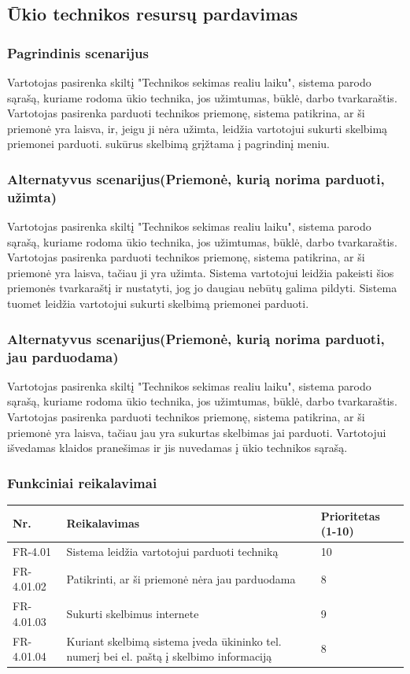\documentclass[oneside]{VUMIFPSkursinis}
\begin{document}
\subsection{Ūkio technikos resursų pardavimas}
\subsubsection{Pagrindinis scenarijus}
	Vartotojas pasirenka skiltį "Technikos sekimas realiu laiku", sistema parodo sąrašą, kuriame rodoma ūkio technika, jos užimtumas, būklė, darbo tvarkaraštis. Vartotojas pasirenka parduoti technikos priemonę, sistema patikrina, ar ši priemonė yra laisva, ir, jeigu ji nėra užimta, leidžia vartotojui sukurti skelbimą priemonei parduoti. sukūrus skelbimą grįžtama į pagrindinį meniu.
\subsubsection{Alternatyvus scenarijus(Priemonė, kurią norima parduoti, užimta)}
	Vartotojas pasirenka skiltį "Technikos sekimas realiu laiku", sistema parodo sąrašą, kuriame rodoma ūkio technika, jos užimtumas, būklė, darbo tvarkaraštis. Vartotojas pasirenka parduoti technikos priemonę, sistema patikrina, ar ši priemonė yra laisva, tačiau ji yra užimta. Sistema vartotojui leidžia pakeisti šios priemonės tvarkaraštį ir nustatyti, jog jo daugiau nebūtų galima pildyti. Sistema tuomet leidžia vartotojui sukurti skelbimą priemonei parduoti.
\subsubsection{Alternatyvus scenarijus(Priemonė, kurią norima parduoti, jau parduodama)}
	Vartotojas pasirenka skiltį "Technikos sekimas realiu laiku", sistema parodo sąrašą, kuriame rodoma ūkio technika, jos užimtumas, būklė, darbo tvarkaraštis. Vartotojas pasirenka parduoti technikos priemonę, sistema patikrina, ar ši priemonė yra laisva, tačiau jau yra sukurtas skelbimas jai parduoti. Vartotojui išvedamas klaidos pranešimas ir jis nuvedamas į ūkio technikos sąrašą.
\subsubsection{Funkciniai reikalavimai}
\begin{table}[htbp]
	\begin{tabularx}{1\textwidth}{ |P{2.5cm}|X|P{3cm }| }  \hline
    Nr. & Reikalavimas &  Prioritetas (1-10)  \\   \hline 
    FR-4.01 & Sistema leidžia vartotojui parduoti techniką & 10  \\   \hline
		FR-4.01.02 & Patikrinti, ar ši priemonė nėra jau parduodama & 8 \\ \hline
		FR-4.01.03 & Sukurti skelbimus internete & 9 \\ \hline
		FR-4.01.04 & Kuriant skelbimą sistema įveda ūkininko tel. numerį bei el. paštą į skelbimo informaciją & 8 \\ \hline
	\end{tabularx}
\end{table}
\end{document}
